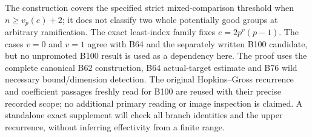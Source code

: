 \begin{remark}
\label{rem:B-RD101-scope}
The construction covers the specified strict mixed-comparison
threshold when $n\ge v_p(e)+2$; it does not classify
two whole potentially good groups at arbitrary ramification.
The exact least-index family fixes $e=2p^v(p-1)$.
The cases $v=0$ and $v=1$ agree with B64 and the
separately written B100 candidate, but no unpromoted
B100 result is used as a dependency here.
The proof uses the complete canonical B62 construction,
B64 actual-target estimate and B76 wild necessary
bound/dimension detection.
The original Hopkins--Gross recurrence and coefficient
passages freshly read for B100 are reused with their
precise recorded scope; no additional primary reading
or image inspection is claimed.
A standalone exact supplement will check all branch
identities and the upper recurrence, without inferring
effectivity from a finite range.
\end{remark}
